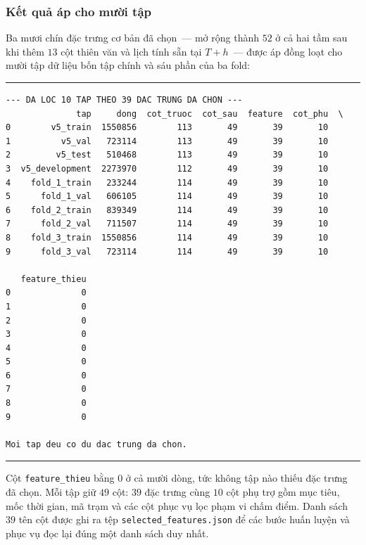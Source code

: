 \documentclass[12pt, a4paper]{report}
\begin{document}
\subsubsection{Kết quả áp cho mười tập}

Ba mươi chín đặc trưng cơ bản đã chọn~--- mở rộng thành $52$ ở cả hai tầm sau khi thêm $13$ cột thiên văn và lịch tính sẵn tại $T{+}h$~--- được áp đồng loạt cho mười tập dữ liệu bốn tập chính và sáu phần
của ba fold:

\begingroup
\par\vspace{6pt}\hrule\vspace{4pt}
\small\renewcommand{\baselinestretch}{1.0}\selectfont
\begin{verbatim}
--- DA LOC 10 TAP THEO 39 DAC TRUNG DA CHON ---
              tap     dong  cot_truoc  cot_sau  feature  cot_phu  \
0        v5_train  1550856        113       49       39       10   
1          v5_val   723114        113       49       39       10   
2         v5_test   510468        113       49       39       10   
3  v5_development  2273970        112       49       39       10   
4    fold_1_train   233244        114       49       39       10   
5      fold_1_val   606105        114       49       39       10   
6    fold_2_train   839349        114       49       39       10   
7      fold_2_val   711507        114       49       39       10   
8    fold_3_train  1550856        114       49       39       10   
9      fold_3_val   723114        114       49       39       10   

   feature_thieu  
0              0  
1              0  
2              0  
3              0  
4              0  
5              0  
6              0  
7              0  
8              0  
9              0  

Moi tap deu co du dac trung da chon.
\end{verbatim}
\vspace{2pt}\hrule\par\vspace{6pt}
\endgroup

Cột \texttt{feature\_thieu} bằng $0$ ở cả mười dòng, tức không tập nào thiếu đặc trưng đã chọn.
Mỗi tập giữ $49$ cột: $39$ đặc trưng cùng $10$ cột phụ trợ gồm mục tiêu, mốc thời gian, mã trạm
và các cột phục vụ lọc phạm vi chấm điểm. Danh sách $39$ tên cột được ghi ra tệp
\texttt{selected\_features.json} để các bước huấn luyện và phục vụ đọc lại đúng một danh sách duy
nhất.
\end{document}
